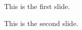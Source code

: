 \documentclass{beamer}
\begin{document}
    \begin{frame}
        This is the first slide.
    \end{frame}

    \begin{frame}
        This is the second slide.
    \end{frame}
\end{document}
